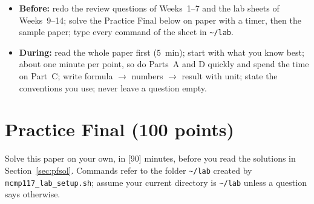 \documentclass[11pt,a4paper]{article}
\newcommand{\cmd}[1]{\texttt{#1}}
\begin{document}
\begin{tryit}
\begin{itemize}
  \item \textbf{Before:} redo the review questions of Weeks~1--7 and the lab sheets of Weeks~9--14; solve the Practice Final below on paper with a timer, then the sample paper; type every command of the sheet in \texttt{\textasciitilde/lab}.
  \item \textbf{During:} read the whole paper first ($5$~min); start with what you know best; about one minute per point, so do Parts~A and D quickly and spend the time on Part~C; write formula $\to$ numbers $\to$ result with unit; state the conventions you use; never leave a question empty.
\end{itemize}
\end{tryit}

\section{Practice Final (100 points)}
\label{sec:pf}

Solve this paper on your own, in [90] minutes, before you read the solutions in Section~\ref{sec:pfsol}. Commands refer to the folder \texttt{\textasciitilde/lab} created by \cmd{mcmp117\_lab\_setup.sh}; assume your current directory is \texttt{\textasciitilde/lab} unless a question says otherwise.
\end{document}
